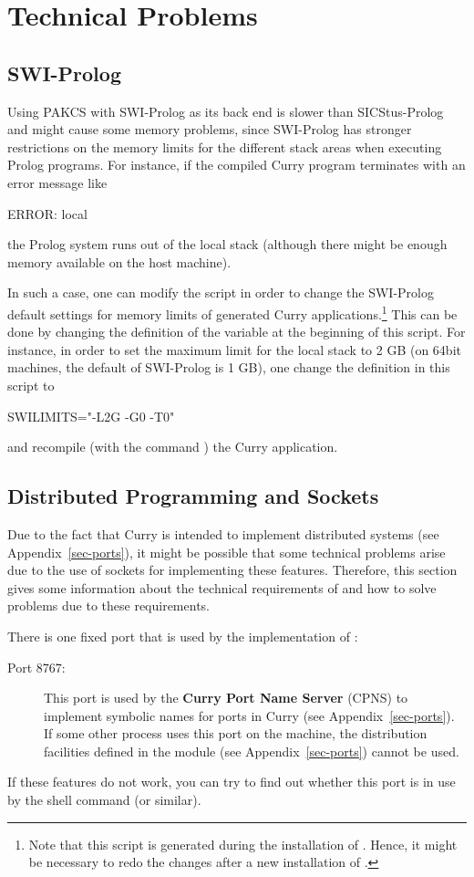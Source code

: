 \section{Technical Problems}

\subsection{SWI-Prolog}

Using PAKCS with SWI-Prolog as its back end is slower than
SICStus-Prolog and might cause some memory problems,
since SWI-Prolog has stronger restrictions on the memory limits
for the different stack areas when executing Prolog programs.
For instance, if the compiled Curry program terminates
with an error message like
\begin{curry}
ERROR: local
\end{curry}
the Prolog system runs out of the local stack (although there
might be enough memory available on the host machine).

In such a case, one can modify the script
in order to change the SWI-Prolog default settings
for memory limits of generated Curry applications.\footnote{%
Note that this script is generated
during the installation of \CYS. Hence, it might be necessary
to redo the changes after a new installation of \CYS.}
This can be done by changing the definition of the variable
 at the beginning of this script.
For instance, in order to set the maximum limit for
the local stack to 2 GB (on 64bit machines, the default of SWI-Prolog
is 1 GB), one change the definition in this script to
\begin{curry}
SWILIMITS="-L2G -G0 -T0"
\end{curry}
and recompile (with the \CYS command )
the Curry application.


\subsection{Distributed Programming and Sockets}

Due to the fact that Curry is intended to implement
distributed systems (see Appendix~\ref{sec-ports}),
it might be possible that some technical problems
arise due to the use of sockets for implementing these
features. Therefore, this section gives some information
about the technical requirements of \CYS and how to solve
problems due to these requirements.

There is one fixed port that is used by the implementation of \CYS:
\begin{description}
\item[Port 8767:] This port is used by the
{\bf Curry Port Name Server} (CPNS) to implement symbolic names for
ports in Curry (see Appendix~\ref{sec-ports}).
If some other process uses this port on the machine,
the distribution facilities defined in the module 
(see Appendix~\ref{sec-ports}) cannot be used.
\end{description}
If these features do not work, you can try to find out
whether this port is in use by the shell command
 (or similar).

